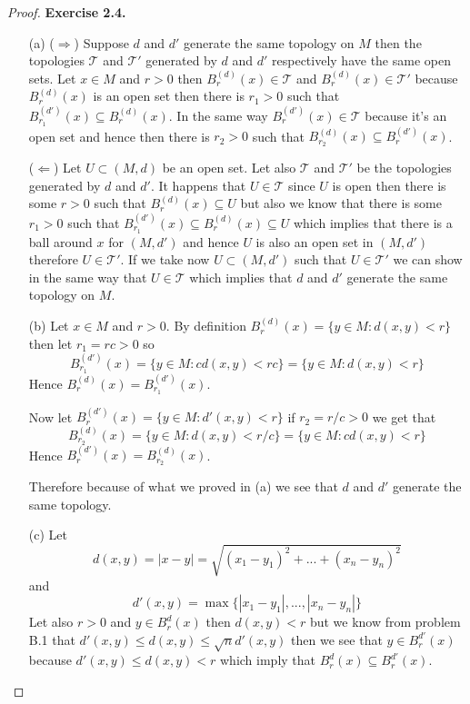 \documentclass[11pt]{article}
\newcommand{\Topo}{\mathcal{T}}
\theoremstyle{definition}
\begin{document}
\cleardoublepage
\begin{proof}{\textbf{Exercise 2.4.}}
\begin{itemize}
    \item [(a)]
    ($\Rightarrow$) Suppose $d$ and $d'$ generate the same topology on $M$ then
    the topologies $\Topo$ and $\Topo'$ generated by $d$ and $d'$ respectively
    have the same open sets.
    Let $x \in M$ and $r > 0$ then $B_r^{(d)}(x) \in \Topo$ and
    $B_r^{(d)}(x) \in \Topo'$ because $B_r^{(d)}(x)$ is an open set then there
    is $r_1 > 0$ such that $B_{r_1}^{(d')}(x) \subseteq B_r^{(d)}(x)$. In the
    same way $B_r^{(d')}(x) \in \Topo$ because it's an open set and hence
    then there is $r_2 > 0$ such that $B_{r_2}^{(d)}(x) \subseteq B_r^{(d')}(x)$.

    ($\Leftarrow$) Let $U \subset (M,d)$ be an open set. Let also
    $\Topo$ and $\Topo'$ be the topologies generated by $d$ and $d'$.
    It happens that $U \in \Topo$ since $U$ is open then there
    is some $r > 0$ such that $B_{r}^{(d)}(x) \subseteq U$ but also we know
    that there is some $r_1 > 0$ such that
    $B_{r_1}^{(d')}(x) \subseteq B_{r}^{(d)}(x) \subseteq U$ which implies
    that there is a ball around $x$ for $(M, d')$ and hence $U$ is also an open
    set in $(M,d')$ therefore $U \in \Topo'$. If we take now $U \subset (M,d')$
    such that $U \in \Topo'$ we can show in the same way that $U \in \Topo$
    which implies that $d$ and $d'$ generate the same topology on $M$.

    \item [(b)] Let $x \in M$ and $r>0$. By definition
    $B_{r}^{(d)}(x) = \{y \in M: d(x,y) < r\}$ then let $r_1 = rc > 0$ so
    $$B_{r_1}^{(d')}(x) = \{y \in M: cd(x,y) < rc\} = \{y \in M: d(x,y) < r\}$$
    Hence $B_{r}^{(d)}(x) = B_{r_1}^{(d')}(x)$.

    Now let $B_{r}^{(d')}(x) = \{y \in M: d'(x,y) < r\}$ if $r_2 = r/c > 0$
    we get that
    $$B_{r_2}^{(d)}(x) = \{y \in M: d(x,y) < r/c\} = \{y \in M: cd(x,y) < r\}$$
    Hence $B_{r}^{(d')}(x) = B_{r_2}^{(d)}(x)$.

    Therefore because of what we proved in (a) we see that $d$ and $d'$
    generate the same topology.

    \item [(c)] Let
    $$d(x,y) = |x - y| = \sqrt{(x_1 - y_1)^2 + ... + (x_n - y_n)^2}$$
    and
    $$d'(x,y) = \max\{|x_1 - y_1|, ..., |x_n - y_n|\}$$
    Let also $r > 0$ and $y \in B_r^d(x)$ then $d(x,y) < r$ but we know
    from problem B.1 that $d'(x,y) \leq d(x,y) \leq \sqrt{n}d'(x,y)$ then
    we see that $y \in B_{r}^{d'}(x)$ because
    $d'(x,y) \leq d(x,y) < r$ which imply that
    $B_r^d(x) \subseteq B_{r}^{d'}(x)$.


\end{itemize}
\end{proof}
\end{document}

